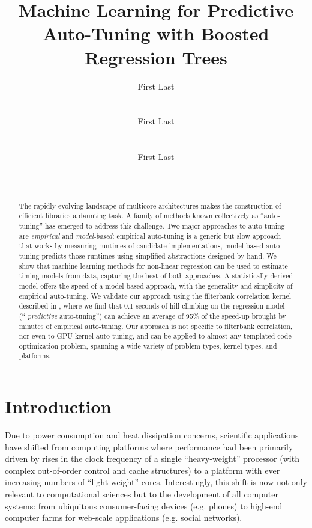 \documentclass{sig-alternate}
\title{Machine Learning for Predictive Auto-Tuning with Boosted Regression Trees}
\author{
\alignauthor First Last\\
\affaddr{Affiliation line 1}\\
\affaddr{Affiliation line 2}\\
\email{anon@mail.com}
\alignauthor First Last\\
\affaddr{Affiliation line 1}\\
\affaddr{Affiliation line 2}\\
\email{anon@mail.com}
\alignauthor First Last\\
\affaddr{Affiliation line 1}\\
\affaddr{Affiliation line 2}\\
\email{anon@mail.com}
}
\begin{document}
\maketitle

\begin{abstract}

The rapidly evolving landscape of multicore architectures makes
the construction of efficient libraries a daunting task.
A family of methods known collectively as ``auto-tuning'' has emerged to
address this challenge.  Two major approaches to auto-tuning are
{\em empirical} and {\em model-based}:
empirical auto-tuning is a generic but slow approach that works by measuring runtimes of
candidate implementations, model-based auto-tuning predicts those runtimes using simplified abstractions designed by hand.
We show that machine learning methods for non-linear regression can be used
to estimate timing models from data, capturing the best of both approaches.
A statistically-derived model offers the speed of a model-based approach,
with the generality and simplicity of empirical auto-tuning.
We validate our approach using the filterbank
correlation kernel described in \citet{pinto+cox:2011gcg}, where we find that
0.1 seconds of hill climbing on the regression model (``{\em
predictive} auto-tuning'') can achieve an average of 95\% of the
speed-up brought by minutes of empirical auto-tuning.  Our approach is not
specific to filterbank correlation, nor even to GPU kernel auto-tuning, and can
be applied to almost any templated-code optimization problem, spanning a wide
variety of problem types, kernel types, and platforms.

\end{abstract}


\section{Introduction}



Due to power consumption and heat dissipation concerns, scientific applications
have shifted from computing platforms where performance had been primarily
driven by rises in the clock frequency of a single ``heavy-weight'' processor
(with complex out-of-order control and cache structures) to a platform with
ever increasing numbers of ``light-weight'' cores. Interestingly, this shift is
now not only relevant to computational sciences but to the development of all
computer systems: from ubiquitous consumer-facing devices (e.g. phones) to
high-end computer farms for web-scale applications (e.g. social networks).
\end{document}
